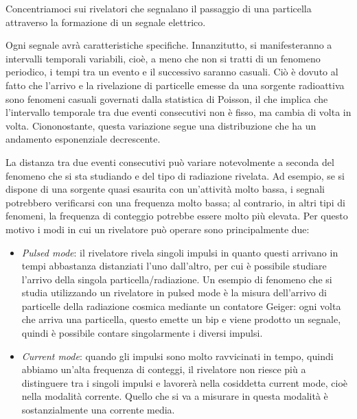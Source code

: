 Concentriamoci sui rivelatori che segnalano il passaggio di una particella attraverso la formazione di un segnale elettrico.

\begin{figure}[H]
   \centering
\end{figure}

Ogni segnale avrà caratteristiche specifiche. Innanzitutto, si manifesteranno a intervalli temporali variabili, cioè, a meno che non si tratti di un fenomeno periodico, i tempi tra un evento e il successivo saranno casuali. Ciò è dovuto al fatto che l'arrivo e la rivelazione di particelle emesse da una sorgente radioattiva sono fenomeni casuali governati dalla statistica di Poisson, il che implica che l'intervallo temporale tra due eventi consecutivi non è fisso, ma cambia di volta in volta. Ciononostante, questa variazione segue una distribuzione che ha un andamento esponenziale decrescente.

La distanza tra due eventi consecutivi può variare notevolmente a seconda del fenomeno che si sta studiando e del tipo di radiazione rivelata. Ad esempio, se si dispone di una sorgente quasi esaurita con un'attività molto bassa, i segnali potrebbero verificarsi con una frequenza molto bassa; al contrario, in altri tipi di fenomeni, la frequenza di conteggio potrebbe essere molto più elevata. Per questo motivo i modi in cui un rivelatore può operare sono principalmente due:

\begin{itemize}[leftmargin=0.5cm]
   \item \textit{Pulsed mode}: il rivelatore rivela singoli impulsi in quanto questi arrivano in tempi abbastanza distanziati l'uno dall'altro, per cui è possibile studiare l'arrivo della singola particella/radiazione. Un esempio di fenomeno che si studia utilizzando un rivelatore in pulsed mode è la misura dell'arrivo di particelle della radiazione cosmica mediante un contatore Geiger: ogni volta che arriva una particella, questo emette un bip e viene prodotto un segnale, quindi è possibile contare singolarmente i diversi impulsi.
   \item \textit{Current mode}: quando gli impulsi sono molto ravvicinati in tempo, quindi abbiamo un'alta frequenza di conteggi, il rivelatore non riesce più a distinguere tra i singoli impulsi e lavorerà nella cosiddetta current mode, cioè nella modalità corrente. Quello che si va a misurare in questa modalità è sostanzialmente una corrente media.
\end{itemize}

